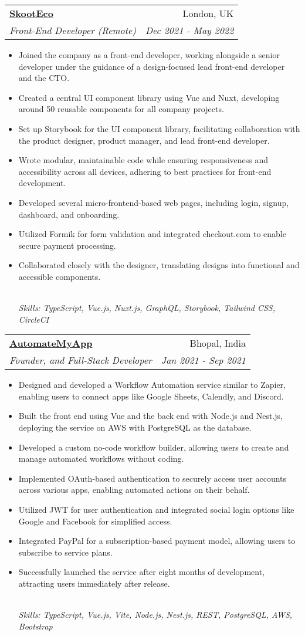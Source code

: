 \documentclass[letterpaper,12pt]{article}
\makeatletter
\newcommand{\resumeItem}[1]{
  \item\small{#1}\vspace{-2pt}
}
\newcommand{\resumeSubheading}[4]{
  \vspace{-2pt}\item
    \begin{tabular*}{0.97\textwidth}[t]{l@{\extracolsep{\fill}}r}
      \textbf{#1} & \small{#2} \\
      \emph{\small{#3}} & \emph{\small{#4}} \\
    \end{tabular*}\vspace{-5pt}
}
\newcommand{\resumeItemFooter}[1]{
    \\ \vspace{7pt}\hspace{-0.35in}\footnotesize\emph{#1}
}
\newcommand{\resumeItemListStart}{\begin{itemize}}
\newcommand{\resumeItemListEnd}{\end{itemize}\vspace{-5pt}}
\def\myHometown{Bhopal, India}
\def\skootLink{https://skoot.eco}
\def\automateMyAppLink{https://automatemyapp.com}
\makeatother
\begin{document}
\resumeSubheading
{\href{\skootLink}{\color{blue}SkootEco}}{London, UK}
{Front-End Developer (Remote)}{Dec 2021 - May 2022}
\resumeItemListStart
\resumeItem{Joined the company as a front-end developer, working alongside a senior developer under the guidance of a design-focused lead front-end developer and the CTO.}
\resumeItem{Created a central UI component library using Vue and Nuxt, developing around 50 reusable components for all company projects.}
\resumeItem{Set up Storybook for the UI component library, facilitating collaboration with the product designer, product manager, and lead front-end developer.}
\resumeItem{Wrote modular, maintainable code while ensuring responsiveness and accessibility across all devices, adhering to best practices for front-end development.}
\resumeItem{Developed several micro-frontend-based web pages, including login, signup, dashboard, and onboarding.}
\resumeItem{Utilized Formik for form validation and integrated checkout.com to enable secure payment processing.}
\resumeItem{Collaborated closely with the designer, translating designs into functional and accessible components.}
\resumeItemFooter{Skills: TypeScript, Vue.js, Nuxt.js, GraphQL, Storybook, Tailwind CSS, CircleCI}
\resumeItemListEnd

\resumeSubheading
{\href{\automateMyAppLink}{\color{blue}AutomateMyApp}}{\myHometown}
{Founder, and Full-Stack Developer}{Jan 2021 - Sep 2021}
\resumeItemListStart
\resumeItem{Designed and developed a Workflow Automation service similar to Zapier, enabling users to connect apps like Google Sheets, Calendly, and Discord.}
\resumeItem{Built the front end using Vue and the back end with Node.js and Nest.js, deploying the service on AWS with PostgreSQL as the database.}
\resumeItem{Developed a custom no-code workflow builder, allowing users to create and manage automated workflows without coding.}
\resumeItem{Implemented OAuth-based authentication to securely access user accounts across various apps, enabling automated actions on their behalf.}
\resumeItem{Utilized JWT for user authentication and integrated social login options like Google and Facebook for simplified access.}
\resumeItem{Integrated PayPal for a subscription-based payment model, allowing users to subscribe to service plans.}
\resumeItem{Successfully launched the service after eight months of development, attracting users immediately after release.}
\resumeItemFooter{Skills: TypeScript, Vue.js, Vite, Node.js, Nest.js, REST, PostgreSQL, AWS, Bootstrap}
\resumeItemListEnd
\end{document}
